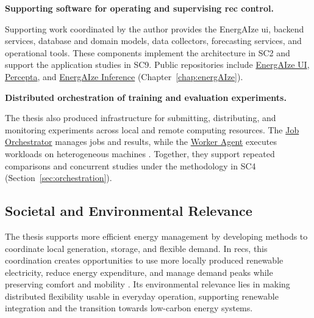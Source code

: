 \begin{description}[leftmargin=3.6em,labelwidth=3em,labelsep=0.6em,align=left,font=\normalfont\bfseries,itemsep=0.35\baselineskip,parsep=0pt,topsep=0.5\baselineskip]
\item[OSSC5] \textbf{Supporting software for operating and supervising \gls{rec} control.}\par\nobreak
Supporting work coordinated by the author provides the EnergAIze \gls{ui}, backend services, database and domain models, data collectors, forecasting services, and operational tools. These components implement the architecture in SC2 and support the application studies in SC9. Public repositories include \href{https://github.com/Soft-CPS-Research-Group/energaize_ui}{EnergAIze UI}, \href{https://github.com/Soft-CPS-Research-Group/Percepta}{Percepta}, and \href{https://github.com/Soft-CPS-Research-Group/energAIze_inference}{EnergAIze Inference} \parencite{softcps2026energaizeui,softcps2026perceptarepo,softcps2026inferencerepo} (Chapter~\ref{chap:energAIze}).

\item[OSSC6] \textbf{Distributed orchestration of training and evaluation experiments.}\par\nobreak
The thesis also produced infrastructure for submitting, distributing, and monitoring experiments across local and remote computing resources. The \href{https://github.com/Soft-CPS-Research-Group/job_orchestrator_agent}{Job Orchestrator} manages jobs and results, while the \href{https://github.com/Soft-CPS-Research-Group/job_worker_agent}{Worker Agent} executes workloads on heterogeneous machines \parencite{softcps2026orchestratorrepo,softcps2026workerrepo}. Together, they support repeated comparisons and concurrent studies under the methodology in SC4 (Section~\ref{sec:orchestration}).
\end{description}

\subsection{Societal and Environmental Relevance}
\label{sec:intro-societal}

The thesis supports more efficient energy management by developing methods to coordinate local generation, storage, and flexible demand. In \glspl{rec}, this coordination creates opportunities to use more locally produced renewable electricity, reduce energy expenditure, and manage demand peaks while preserving comfort and mobility \parencite{reis2021businessmodels,hussain2023flexibility}. Its environmental relevance lies in making distributed flexibility usable in everyday operation, supporting renewable integration and the transition towards low-carbon energy systems.

